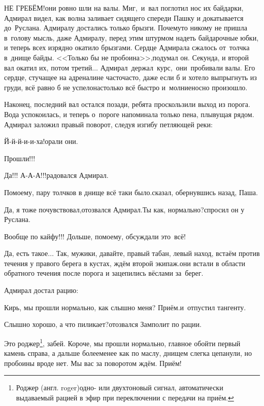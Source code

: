 \diagdash НЕ ГРЕБЁМ!\mdash они ровно шли на валы. Миг,~и~вал поглотил нос их байдарки, Адмирал видел, как волна заливает сидящего спереди Пашку и докатывается до~Руслана. Адмиралу достались только брызги. Почему\sdash то никому не пришла в~голову мысль, даже Адмиралу, перед этим штурмом надеть байдарочные юбки, и теперь всех изрядно окатило брызгами. Сердце Адмирала сжалось от~толчка в~днище байды. <<Только бы не пробоина>>,\mdash подумал он. Секунда, и второй вал окатил их, потом третий$\ldots$ Адмирал~держал~курс,~они~пробивали валы. Его сердце, стучащее на адреналине часто\sdash часто, даже если б и хотело выпрыгнуть из груди, всё равно б не успело\mdash настолько всё быстро и~молниеносно произошло. 

Наконец, последний вал остался позади, ребята проскользили выход из порога. Вода успокоилась, и теперь о~пороге напоминала только пена, плывущая рядом. Адмирал заложил правый поворот, следуя изгибу петляющей реки:

\diagdash Й-й-й-и-и-ха!\mdash орали они.

\diagdash Прошли!!!

\diagdash Да!!! А-А-А!!!\mdash радовался Адмирал.

\diagdash По\sdash моему, пару толчков в днище всё таки было.\mdash сказал, обернувшись назад, Паша. 

\diagdash Да, я тоже почувствовал,\mdash отозвался Адмирал.\mdash Ты как, нормально?\mdash спросил он у Руслана.

\diagdash Вообще по кайфу!!! Дольше, по\sdash моему, обсуждали это~всё!

\diagdash Да, есть такое$\ldots$ Так, мужики, давайте, правый табан, левый наход, встаём против течения у правого берега в кустах, ждём второй экипаж.\mdash они встали в области обратного течения после порога и зацепились вёслами за~берег.

Адмирал достал рацию:

\diagdash Кирь, мы прошли нормально, как слышно меня? Приём.\mdash и~отпустил тангенту.

\diagdash Слышно хорошо, а что пиликает?\mdash отозвался Замполит по рации.

\renewcommand*{\thefootnote}{\fnsymbol{footnote}}
\setcounter{footnote}{0}
\diagdash Это роджер\footnote{Роджер (англ. roger)\mdash одно- или двухтоновый сигнал, автоматически выдаваемый рацией в эфир при переключении с передачи на приём.}, забей. Короче, мы прошли нормально, главное обойти первый камень справа, а дальше более\sdash менее как по маслу, днищем слегка цепанули, но пробоины вроде нет. Мы вас за поворотом ждём. Приём!

